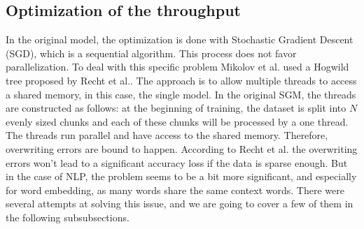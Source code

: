 \documentclass[conference]{IEEEtran}
\begin{document}
\subsection{Optimization of the throughput}

In the original model, the optimization is done with Stochastic Gradient Descent (SGD), which is a sequential algorithm. This process does not favor parallelization. To deal with this specific problem Mikolov et al.\cite{mikolov2} used a Hogwild tree proposed by Recht et al.\cite{hogwild}. The approach is to allow multiple threads to access a shared memory, in this case, the single model. In the original SGM, the threads are constructed as follows: at the beginning of training, the dataset is split into $N$ evenly sized chunks and each of these chunks will be processed by a one thread. The threads run parallel and have access to the shared memory. Therefore, overwriting errors are bound to happen. According to Recht et al.\cite{hogwild} the overwriting errors won't lead to a significant accuracy loss if the data is sparse enough. But in the case of NLP, the problem seems to be a bit more significant, and especially for word embedding, as many words share the same context words. There were several attempts at solving this issue, and we are going to cover a few of them in the following subsubsections.
\end{document}
